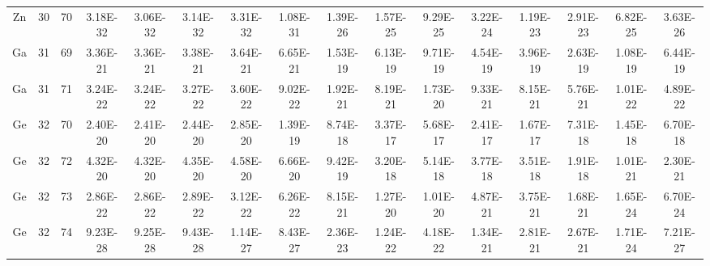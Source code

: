 {\begin{tabular}{|c|c|c|c|c|c|c|c|c|c|c|c|c|c|c|c|}
Zn & 30 & 70   & 3.18E-32  & 3.06E-32  & 3.14E-32  & 3.31E-32  & 1.08E-31  & 1.39E-26  & 1.57E-25  & 9.29E-25  & 3.22E-24  & 1.19E-23  & 2.91E-23  & 6.82E-25  & 3.63E-26  \\
Ga & 31 & 69   & 3.36E-21  & 3.36E-21  & 3.38E-21  & 3.64E-21  & 6.65E-21  & 1.53E-19  & 6.13E-19  & 9.71E-19  & 4.54E-19  & 3.96E-19  & 2.63E-19  & 1.08E-19  & 6.44E-19  \\
Ga & 31 & 71   & 3.24E-22  & 3.24E-22  & 3.27E-22  & 3.60E-22  & 9.02E-22  & 1.92E-21  & 8.19E-21  & 1.73E-20  & 9.33E-21  & 8.15E-21  & 5.76E-21  & 1.01E-22  & 4.89E-22  \\
Ge & 32 & 70   & 2.40E-20  & 2.41E-20  & 2.44E-20  & 2.85E-20  & 1.39E-19  & 8.74E-18  & 3.37E-17  & 5.68E-17  & 2.41E-17  & 1.67E-17  & 7.31E-18  & 1.45E-18  & 6.70E-18  \\
Ge & 32 & 72   & 4.32E-20  & 4.32E-20  & 4.35E-20  & 4.58E-20  & 6.66E-20  & 9.42E-19  & 3.20E-18  & 5.14E-18  & 3.77E-18  & 3.51E-18  & 1.91E-18  & 1.01E-21  & 2.30E-21  \\
Ge & 32 & 73   & 2.86E-22  & 2.86E-22  & 2.89E-22  & 3.12E-22  & 6.26E-22  & 8.15E-21  & 1.27E-20  & 1.01E-20  & 4.87E-21  & 3.75E-21  & 1.68E-21  & 1.65E-24  & 6.70E-24  \\
Ge & 32 & 74   & 9.23E-28  & 9.25E-28  & 9.43E-28  & 1.14E-27  & 8.43E-27  & 2.36E-23  & 1.24E-22  & 4.18E-22  & 1.34E-21  & 2.81E-21  & 2.67E-21  & 1.71E-24  & 7.21E-27  \\






\hline

\end{tabular}}
